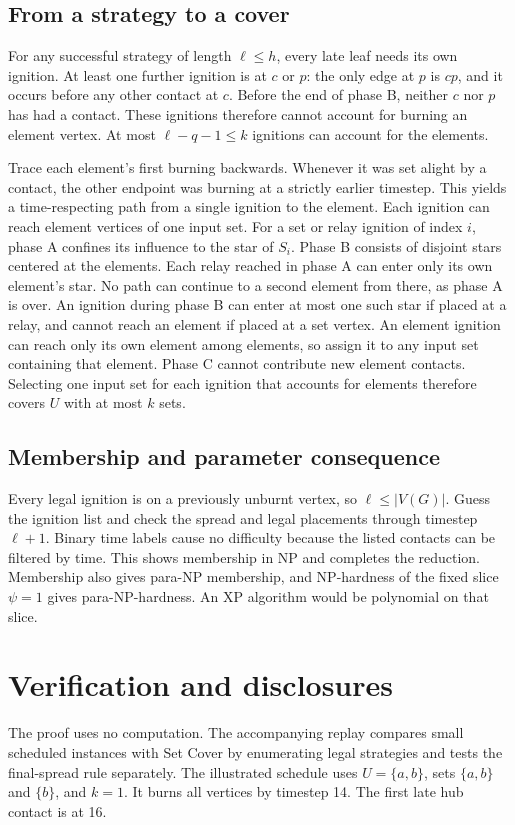 \documentclass[11pt,a4paper]{amsart}
\begin{document}
\subsection*{From a strategy to a cover}
For any successful strategy of length \(\ell\leq h\), every late leaf needs its own ignition. At least one further ignition is at \(c\) or \(p\): the only edge at \(p\) is \(cp\), and it occurs before any other contact at \(c\). Before the end of phase B, neither \(c\) nor \(p\) has had a contact. These ignitions therefore cannot account for burning an element vertex. At most \(\ell-q-1\leq k\) ignitions can account for the elements.

Trace each element's first burning backwards. Whenever it was set alight by a contact, the other endpoint was burning at a strictly earlier timestep. This yields a time-respecting path from a single ignition to the element. Each ignition can reach element vertices of one input set. For a set or relay ignition of index \(i\), phase A confines its influence to the star of \(S_i\). Phase B consists of disjoint stars centered at the elements. Each relay reached in phase A can enter only its own element's star. No path can continue to a second element from there, as phase A is over. An ignition during phase B can enter at most one such star if placed at a relay, and cannot reach an element if placed at a set vertex. An element ignition can reach only its own element among elements, so assign it to any input set containing that element. Phase C cannot contribute new element contacts. Selecting one input set for each ignition that accounts for elements therefore covers \(U\) with at most \(k\) sets.

\subsection*{Membership and parameter consequence}
Every legal ignition is on a previously unburnt vertex, so \(\ell\leq |V(G)|\). Guess the ignition list and check the spread and legal placements through timestep \(\ell+1\). Binary time labels cause no difficulty because the listed contacts can be filtered by time. This shows membership in NP and completes the reduction. Membership also gives para-NP membership, and NP-hardness of the fixed slice \(\psi=1\) gives para-NP-hardness. An XP algorithm would be polynomial on that slice.

\section*{Verification and disclosures}
The proof uses no computation. The accompanying replay compares small scheduled instances with Set Cover by enumerating legal strategies and tests the final-spread rule separately. The illustrated schedule uses \(U=\{a,b\}\), sets \(\{a,b\}\) and \(\{b\}\), and \(k=1\). It burns all vertices by timestep 14. The first late hub contact is at 16.
\end{document}
